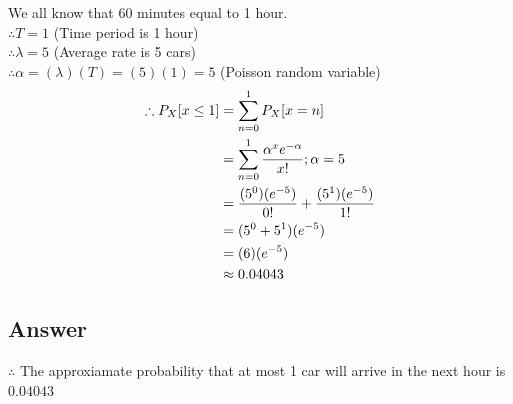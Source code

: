 \documentclass[12pt]{report} %
\begin{document}
\noindent We all know that 60 minutes equal to 1 hour. \\
$\therefore T = 1$ (Time period is 1 hour) \\
$\therefore \lambda = 5$ (Average rate is 5 cars) \\
$\therefore \alpha = (\lambda)(T) = (5)(1) = 5$ (Poisson random variable) \\
\begin{equation} \notag
\begin{split}
    \therefore P_X[x \le 1] & = \sum_{n=0}^{1} P_X[x = n] \\
                            & =  \sum_{n=0}^{1} \frac{\alpha^{x}e^{-\alpha}}{x!} ; \alpha = 5 \\
                            & = \frac{(5^{0})(e^{-5})}{0!} + \frac{(5^{1})(e^{-5})}{1!} \\
                            & = (5^{0} + 5^{1})(e^{-5}) \\
                            & = (6)(e^{-5}) \\
                            & \approx 0.04043 \\
\end{split}
\end{equation}

\subsection*{Answer}

\noindent $\therefore$ The approxiamate probability that at most 1 car will
arrive in the next hour is $0.04043$ \\
\end{document}
